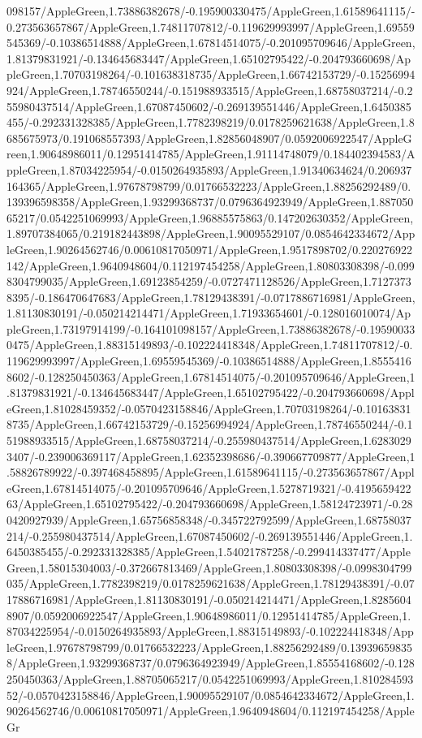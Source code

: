{\begin{tikzternal}
{098157/AppleGreen,1.73886382678/-0.195900330475/AppleGreen,1.61589641115/-0.273563657867/AppleGreen,1.74811707812/-0.119629993997/AppleGreen,1.69559545369/-0.10386514888/AppleGreen,1.67814514075/-0.201095709646/AppleGreen,1.81379831921/-0.134645683447/AppleGreen,1.65102795422/-0.204793660698/AppleGreen,1.70703198264/-0.101638318735/AppleGreen,1.66742153729/-0.15256994924/AppleGreen,1.78746550244/-0.151988933515/AppleGreen,1.68758037214/-0.255980437514/AppleGreen,1.67087450602/-0.269139551446/AppleGreen,1.6450385455/-0.292331328385/AppleGreen,1.7782398219/0.0178259621638/AppleGreen,1.8685675973/0.191068557393/AppleGreen,1.82856048907/0.0592006922547/AppleGreen,1.90648986011/0.12951414785/AppleGreen,1.91114748079/0.184402394583/AppleGreen,1.87034225954/-0.0150264935893/AppleGreen,1.91340634624/0.206937164365/AppleGreen,1.97678798799/0.01766532223/AppleGreen,1.88256292489/0.139396598358/AppleGreen,1.93299368737/0.0796364923949/AppleGreen,1.88705065217/0.0542251069993/AppleGreen,1.96885575863/0.147202630352/AppleGreen,1.89707384065/0.219182443898/AppleGreen,1.90095529107/0.0854642334672/AppleGreen,1.90264562746/0.00610817050971/AppleGreen,1.9517898702/0.220276922142/AppleGreen,1.9640948604/0.112197454258/AppleGreen,1.80803308398/-0.0998304799035/AppleGreen,1.69123854259/-0.0727471128526/AppleGreen,1.71273738395/-0.186470647683/AppleGreen,1.78129438391/-0.0717886716981/AppleGreen,1.81130830191/-0.050214214471/AppleGreen,1.71933654601/-0.128016010074/AppleGreen,1.73197914199/-0.164101098157/AppleGreen,1.73886382678/-0.195900330475/AppleGreen,1.88315149893/-0.102224418348/AppleGreen,1.74811707812/-0.119629993997/AppleGreen,1.69559545369/-0.10386514888/AppleGreen,1.85554168602/-0.128250450363/AppleGreen,1.67814514075/-0.201095709646/AppleGreen,1.81379831921/-0.134645683447/AppleGreen,1.65102795422/-0.204793660698/AppleGreen,1.81028459352/-0.0570423158846/AppleGreen,1.70703198264/-0.101638318735/AppleGreen,1.66742153729/-0.15256994924/AppleGreen,1.78746550244/-0.151988933515/AppleGreen,1.68758037214/-0.255980437514/AppleGreen,1.62830293407/-0.239006369117/AppleGreen,1.62352398686/-0.390667709877/AppleGreen,1.58826789922/-0.397468458895/AppleGreen,1.61589641115/-0.273563657867/AppleGreen,1.67814514075/-0.201095709646/AppleGreen,1.5278719321/-0.419565942263/AppleGreen,1.65102795422/-0.204793660698/AppleGreen,1.58124723971/-0.280420927939/AppleGreen,1.65756858348/-0.345722792599/AppleGreen,1.68758037214/-0.255980437514/AppleGreen,1.67087450602/-0.269139551446/AppleGreen,1.6450385455/-0.292331328385/AppleGreen,1.54021787258/-0.299414337477/AppleGreen,1.58015304003/-0.372667813469/AppleGreen,1.80803308398/-0.0998304799035/AppleGreen,1.7782398219/0.0178259621638/AppleGreen,1.78129438391/-0.0717886716981/AppleGreen,1.81130830191/-0.050214214471/AppleGreen,1.82856048907/0.0592006922547/AppleGreen,1.90648986011/0.12951414785/AppleGreen,1.87034225954/-0.0150264935893/AppleGreen,1.88315149893/-0.102224418348/AppleGreen,1.97678798799/0.01766532223/AppleGreen,1.88256292489/0.139396598358/AppleGreen,1.93299368737/0.0796364923949/AppleGreen,1.85554168602/-0.128250450363/AppleGreen,1.88705065217/0.0542251069993/AppleGreen,1.81028459352/-0.0570423158846/AppleGreen,1.90095529107/0.0854642334672/AppleGreen,1.90264562746/0.00610817050971/AppleGreen,1.9640948604/0.112197454258/AppleGr}
\end{tikzternal}}
